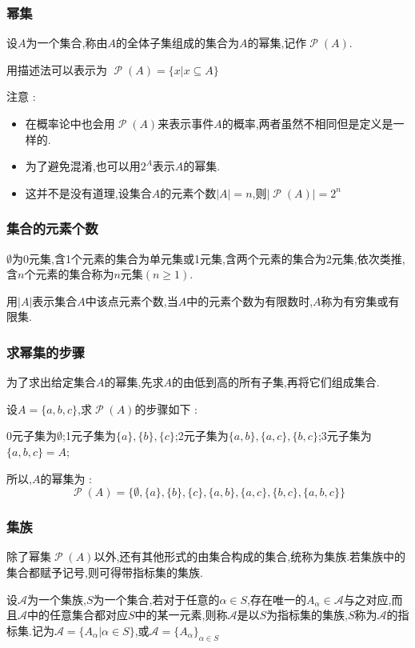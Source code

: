 \documentclass[UTF8,12pt]{ctexbook}
\newcommand{\absoluteValue}[1]{\left\lvert #1 \right\vert}
\newcommand{\powerSetOf}[1]{\powerSet (#1)}
\DeclareMathOperator{\powerSet}{\mathcal{P}}
\begin{document}
{{{{\subsubsection{幂集}{
  设$A$为一个集合,称由$A$的全体子集组成的集合为$A$的幂集,记作$\powerSetOf{A}$.

  用描述法可以表示为 $\powerSetOf{A} = \{x | x \subseteq A\}$

  注意 :

  \begin{itemize}
    \item 在概率论中也会用$\powerSetOf{A}$来表示事件$A$的概率,两者虽然不相同但是定义是一样的.
    \item 为了避免混淆,也可以用$2^A$表示$A$的幂集.
    \item 这并不是没有道理,设集合$A$的元素个数$\absoluteValue{A} = n$,则$\absoluteValue{\powerSetOf{A}} = 2^n$
  \end{itemize}
}%

\subsubsection{集合的元素个数}{
  $\emptyset$为$0$元集,含1个元素的集合为单元集或1元集,含两个元素的集合为2元集,依次类推,含$n$个元素的集合称为$n$元集$(n \geq 1)$.

  用$\absoluteValue{A}$表示集合$A$中该点元素个数,当$A$中的元素个数为有限数时,$A$称为有穷集或有限集.
}%

\subsubsection{求幂集的步骤}{
  为了求出给定集合$A$的幂集,先求$A$的由低到高的所有子集,再将它们组成集合.

  设$A = \{a,b,c\}$,求$\powerSetOf{A}$的步骤如下 :

  0元子集为$\emptyset$;1元子集为$\{a\},\{b\},\{c\}$;2元子集为$\{a,b\},\{a,c\},\{b,c\}$;3元子集为$\{a,b,c\} = A$;

  所以,$A$的幂集为 : $$
    \powerSetOf{A} = \{\emptyset,\{a\},\{b\},\{c\},\{a,b\},\{a,c\},\{b,c\},\{a,b,c\}\}
  $$
}%

\subsubsection{集族}{
除了幂集$\powerSetOf{A}$以外,还有其他形式的由集合构成的集合,统称为集族.若集族中的集合都赋予记号,则可得带指标集的集族.

设$\mathcal{A}$为一个集族,$S$为一个集合,若对于任意的$\alpha \in S$,存在唯一的$A_\alpha \in \mathcal{A}$与之对应,而且$\mathcal{A}$中的任意集合都对应$S$中的某一元素,则称$\mathcal{A}$是以$S$为指标集的集族,$S$称为$\mathcal{A}$的指标集.记为$\mathcal{A} = \{A_\alpha | \alpha \in S\}$,或$\mathcal{A} = \{A_\alpha\}_{\alpha \in S}$

}}}}}
\end{document}
